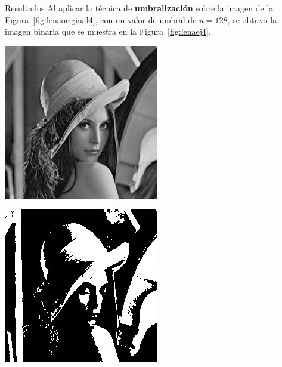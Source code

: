 \documentclass{beamer}
\begin{document}
\begin{frame}[fragile]{Resultados}
	\justifying
    Al aplicar la técnica de \textcolor{unahurverde}{\textbf{umbralización}} sobre la imagen de la Figura~\ref{fig:lenaoriginal4}, 
    con un valor de umbral de $u=128$, se obtuvo la imagen binaria que se muestra en la Figura~\ref{fig:lenaej4}.
	\vspace{0.5cm}
	
	\centering
	\begin{minipage}{0.45\linewidth}
		\centering
		\includegraphics[width=\linewidth]{../results/lena_original}
		\label{fig:lenaoriginal4}
	\end{minipage}\hfill
	\begin{minipage}{0.45\linewidth}
		\centering
		\includegraphics[width=\linewidth]{../results/lena_ej4}

\end{minipage}
\end{frame}
\end{document}
